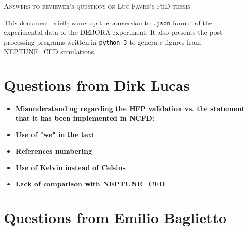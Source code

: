 \documentclass[8pt, a4paper]{article}
\newcommand{\npar}{\vspace{\baselineskip}}
\begin{document}
{\centering

\Large{\textsc{Answers to reviewer's questions on Luc Favre's PhD thesis}}

}

\npar

This document briefly sums up the conversion to \texttt{.json} format of the experimental data of the DEBORA experiment. It also presents the post-processing programs written in \texttt{python 3} to generate figures from NEPTUNE\_CFD simulations.

\npar

\section{Questions from Dirk Lucas}

\begin{itemize}
\setlength{\itemsep}{20pt}
\item \textbf{Misunderstanding regarding the HFP validation vs. the statement that it has been implemented in NCFD:}

\item \textbf{Use of "we" in the text}


\item \textbf{References numbering}

\item \textbf{Use of Kelvin instead of Celsius}

\item \textbf{Lack of comparison with NEPTUNE\_CFD}

\end{itemize}


\clearpage

\section{Questions from Emilio Baglietto}
\end{document}
